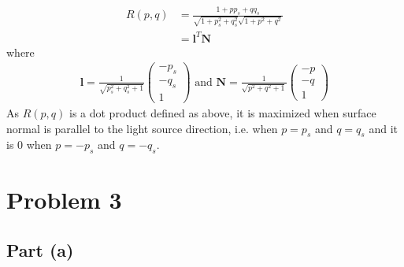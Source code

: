 \documentclass{article}
\begin{document}
\begin{align}
R(p,q) &= \frac{1+pp_s + qq_s}{\sqrt{1+p^2_s+q^2_s}\sqrt{1+p^2+q^2}} \\
&= \mathbf{l}^T\mathbf{N}
\end{align}
where
\begin{align}
\mathbf{l} = \frac{1}{\sqrt{p_s^2+q_s^2+1}}
\begin{pmatrix}
-p_s \\
-q_s \\
1
\end{pmatrix} \text{ and }
\mathbf{N} = \frac{1}{\sqrt{p^2+q^2+1}}
\begin{pmatrix}
-p \\
-q \\
1
\end{pmatrix}
\end{align}
As $R(p,q)$ is a dot product defined as above, it is maximized when surface normal is parallel to the light source direction, i.e. when $p=p_s$ and $q=q_s$ and it is 0 when $p=-p_s$ and $q=-q_s$.


\section*{Problem 3}
\subsection*{Part (a)}
\end{document}
